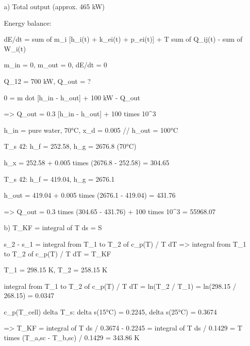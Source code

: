 a) Total output (approx. 465 kW)

Energy balance:

dE/dt = sum of m_i [h_i(t) + k_ei(t) + p_ei(t)] + T sum of Q_ij(t) - sum of W_i(t)

m_in = 0, m_out = 0, dE/dt = 0

Q_12 = 700 kW, Q_out = ?

0 = m dot [h_in - h_out] + 100 kW - Q_out

=> Q_out = 0.3 [h_in - h_out] + 100 times 10^3

h_in = pure water, 70°C, x_d = 0.005 // h_out = 100°C

T_s 42: h_f = 252.58, h_g = 2676.8 (70°C)

h_x = 252.58 + 0.005 times (2676.8 - 252.58) = 304.65

T_s 42: h_f = 419.04, h_g = 2676.1

h_out = 419.04 + 0.005 times (2676.1 - 419.04) = 431.76

=> Q_out = 0.3 times (304.65 - 431.76) + 100 times 10^3 = 55968.07

b) T_KF = integral of T ds = S

s_2 - s_1 = integral from T_1 to T_2 of c_p(T) / T dT => integral from T_1 to T_2 of c_p(T) / T dT = T_KF

T_1 = 298.15 K, T_2 = 258.15 K

integral from T_1 to T_2 of c_p(T) / T dT = ln(T_2 / T_1) = ln(298.15 / 268.15) = 0.0347

c_p(T_cell) delta T_s: delta s(15°C) = 0.2245, delta s(25°C) = 0.3674

=> T_KF = integral of T ds / 0.3674 - 0.2245 = integral of T ds / 0.1429 = T times (T_a,sc - T_b,sc) / 0.1429 = 343.86 K